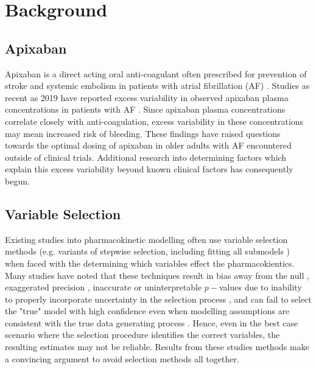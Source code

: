 \section{Background}

\subsection{Apixaban}

Apixaban is a direct acting oral anti-coagulant often prescribed for prevention of stroke and systemic embolism in patients with atrial fibrillation (AF) \cite{BMSmonograph,byon2019apixaban}.  Studies as recent as 2019 have reported excess variability in observed apixaban plasma concentrations in patients with AF \cite{sukumar2019apixaban}. Since apixaban plasma concentrations correlate closely with anti-coagulation, excess variability in these concentrations may mean increased risk of bleeding. These findings have raised questions towards the optimal dosing of apixaban in older adults with AF encountered outside of clinical trials. Additional research into determining factors which explain this excess variability beyond known clinical factors \cite{gulilat2020drug} has consequently begun.

\subsection{Variable Selection}


Existing studies into pharmacokinetic modelling often use variable selection methods (e.g. variants of stepwise selection, including fitting all submodels \cite{cirincione2018population,ueshima2018population}) when faced with the determining which variables effect the pharmacokientics. Many studies have noted that these techniques result in bias away from the null \cite{whittingham2006we}, exaggerated precision \cite{altman1989bootstrap}, inaccurate or uninterpretable $p-$values due to inability to properly incorporate uncertainty in the selection process \cite{harrell2015regression}, and can fail to select the "true" model with high confidence even when modelling assumptions are consistent with the true data generating process \cite{smith2018step}.  Hence, even in the best case scenario where the selection procedure identifies the correct variables, the resulting estimates may not be reliable.  Results from these studies methods make a convincing argument to avoid selection methods all together.

